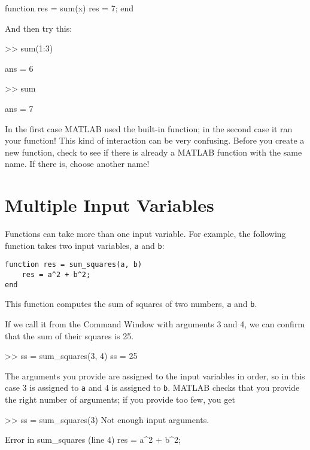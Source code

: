 
\begin{code}
function res = sum(x)
   res = 7;
end
\end{code}

And then try this:

\begin{code}
>> sum(1:3)

ans = 6

>> sum

ans = 7
\end{code}

In the first case MATLAB used the built-in function; in the second
case it ran your function!  This kind of interaction can be very
confusing.  Before you create a new function, check to see if there is
already a MATLAB function with the same name.  If there is, choose
another name!

\section{Multiple Input Variables}
\label{hypotenuse}


Functions can take more than one input variable.
For example, the following function takes two input variables,
{\tt a} and {\tt b}:

\begin{lstlisting}[caption={A function that computes the sum of squares of two numbers}, label={lst:hyp_function}]
function res = sum_squares(a, b)
    res = a^2 + b^2;
end
\end{lstlisting}
  
This function computes the sum of squares of two numbers, {\tt a}
and {\tt b}.

If we call it from the Command Window with arguments 3 and 4, we can
confirm that the sum of their squares is 25.

\begin{code}
>> ss = sum_squares(3, 4)
ss = 25
\end{code}

The arguments you provide are assigned to the input variables in
order, so in this case 3 is assigned to {\tt a} and 4 is assigned to
{\tt b}.  MATLAB checks that you provide the right number of arguments;
if you provide too few, you get

\begin{code}
>> ss = sum_squares(3)
Not enough input arguments.

Error in sum_squares (line 4)
    res = a^2 + b^2;
\end{code}


